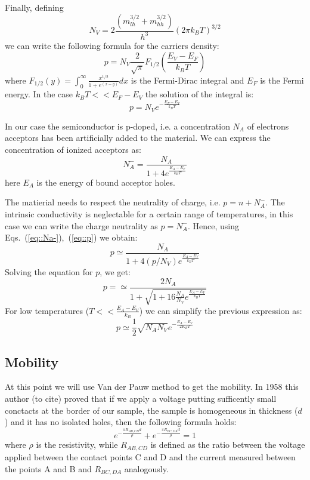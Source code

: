 \documentclass[11pt,a4paper]{article}
\begin{document}
Finally, defining 
\begin{equation}
N_V=2\frac{(m_{lh}^{3/2}+m_{hh}^{3/2})}{h^3}(2\pi k_BT)^{3/2}
\end{equation} we can write the following formula for the carriers density:
\begin{equation}
p=N_V\frac{2}{\sqrt{\pi}}F_{1/2}\left(\frac{E_V-E_F}{k_BT}\right)
\end{equation} where $F_{1/2}(y)=\int_0^\infty\frac{x^{1/2}}{1+e^{(x-y)}}dx$ is the Fermi-Dirac integral and $E_F$ is the Fermi energy. In the case $k_BT<<E_F-E_V$ the solution of the integral is:
\begin{equation}
p=N_Ve^{-\frac{E_F-E_V}{k_BT}}\label{eq::p}
\end{equation}

In our case the semiconductor is p-doped, i.e. a concentration $N_A$ of electrons acceptors has been artificially added to the material. We can express the concentration of ionized acceptors as:
\begin{equation}
N_A^-=\frac{N_A}{1+4e^{\frac{E_A-E_F}{k_BT}}}\label{eq::Na-}
\end{equation}
here $E_A$ is the energy of bound acceptor holes.

The matierial needs to respect the neutrality of charge, i.e. $p=n+N_A^-$. The intrinsic conductivity is neglectable for a certain range of temperatures, in this case we can write the charge neutrality as $p=N_A^-$. Hence, using Eqs.~(\ref{eq::Na-}),~(\ref{eq::p}) we obtain:
\begin{equation}
p\simeq\frac{N_A}{1+4(p/N_V)e^{\frac{E_A-E_V}{k_BT}}}
\end{equation}
Solving the equation for $p$, we get:
\begin{equation}
p=\simeq\frac{2N_A}{1+\sqrt{1+16\frac{N_A}{N_V}e^\frac{E_A-E_V}{k_BT}}}
\end{equation}For low temperatures ($T<<\frac{E_A-E_V}{k_B}$) we can simplify the previous expression as:
\begin{equation}
p\simeq \frac{1}{2}\sqrt{N_AN_V}e^{-\frac{E_A-E_V}{2K_BT}}
\end{equation}

\subsection{Mobility}
At this point we will use Van der Pauw method to get the mobility. In 1958 this author (to cite) proved that if we apply a voltage putting sufficently small conctacts at the border of our sample, the sample is homogeneous in thickness ($d$) and it has no isolated holes, then the following formula holds:
\begin{equation}
e^{-\frac{\pi R_{AB,CD}d}{\rho}}+e^{-\frac{\pi R_{BC,DA}d}{\rho}}=1
\end{equation}
where $\rho$ is the resistivity, while $R_{AB,CD}$ is defined as the ratio between the voltage applied between the contact points C and D and the current measured between the points A and B and $R_{BC,DA}$ analogously.
\end{document}
